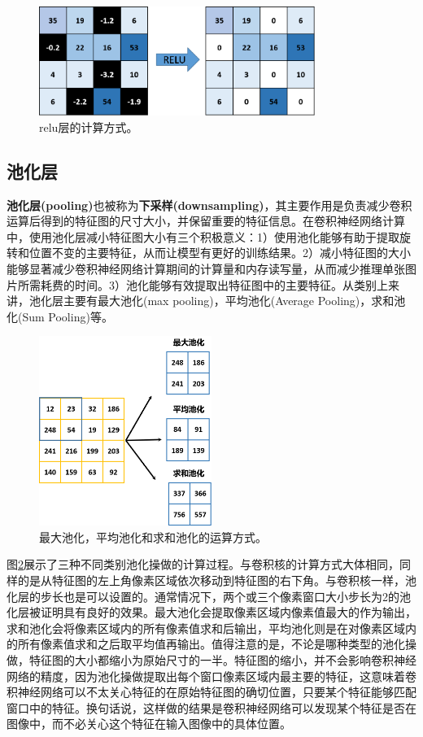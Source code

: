 \begin{figure}[ht]
	\centering
	\includegraphics[width=0.8\textwidth]{figures/relu.png}
	\caption{relu层的计算方式。}
	\label{relu}
\end{figure}

\subsection{池化层}
\textbf{池化层(pooling)}也被称为\textbf{下采样(downsampling)}，其主要作用是负责减少卷积运算后得到的特征图的尺寸大小，并保留重要的特征信息。在卷积神经网络计算中，使用池化层减小特征图大小有三个积极意义：1）使用池化能够有助于提取旋转和位置不变的主要特征，从而让模型有更好的训练结果。2）减小特征图的大小能够显著减少卷积神经网络计算期间的计算量和内存读写量，从而减少推理单张图片所需耗费的时间。3）池化能够有效提取出特征图中的主要特征。从类别上来讲，池化层主要有最大池化(max pooling)，平均池化(Average Pooling)，求和池化(Sum Pooling)等。

\begin{figure}[ht]
	\centering
	\includegraphics[width=0.5\textwidth]{figures/pooling.png}
	\caption{最大池化，平均池化和求和池化的运算方式。}
	\label{pooling}
\end{figure}

图\ref{pooling}展示了三种不同类别池化操做的计算过程。与卷积核的计算方式大体相同，同样的是从特征图的左上角像素区域依次移动到特征图的右下角。与卷积核一样，池化层的步长也是可以设置的。通常情况下，两个或三个像素窗口大小步长为2的池化层被证明具有良好的效果。最大池化会提取像素区域内像素值最大的作为输出，求和池化会将像素区域内的所有像素值求和后输出，平均池化则是在对像素区域内的所有像素值求和之后取平均值再输出。值得注意的是，不论是哪种类型的池化操做，特征图的大小都缩小为原始尺寸的一半。特征图的缩小，并不会影响卷积神经网络的精度，因为池化操做提取出每个窗口像素区域内最主要的特征，这意味着卷积神经网络可以不太关心特征的在原始特征图的确切位置，只要某个特征能够匹配窗口中的特征。换句话说，这样做的结果是卷积神经网络可以发现某个特征是否在图像中，而不必关心这个特征在输入图像中的具体位置。

